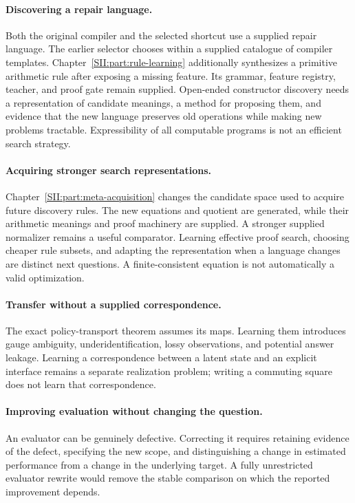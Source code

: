 \paragraph{Discovering a repair language.}
Both the original compiler and the selected shortcut use a supplied repair language. The earlier selector chooses within a supplied catalogue of compiler templates. Chapter~\ref{SII:part:rule-learning} additionally synthesizes a primitive arithmetic rule after exposing a missing feature. Its grammar, feature registry, teacher, and proof gate remain supplied. Open-ended constructor discovery needs a representation of candidate meanings, a method for proposing them, and evidence that the new language preserves old operations while making new problems tractable. Expressibility of all computable programs is not an efficient search strategy.

\paragraph{Acquiring stronger search representations.}
Chapter~\ref{SII:part:meta-acquisition} changes the candidate space used to acquire future discovery rules. The new equations and quotient are generated, while their arithmetic meanings and proof machinery are supplied. A stronger supplied normalizer remains a useful comparator. Learning effective proof search, choosing cheaper rule subsets, and adapting the representation when a language changes are distinct next questions. A finite-consistent equation is not automatically a valid optimization.

\paragraph{Transfer without a supplied correspondence.}
The exact policy-transport theorem assumes its maps. Learning them introduces gauge ambiguity, underidentification, lossy observations, and potential answer leakage. Learning a correspondence between a latent state and an explicit interface remains a separate realization problem; writing a commuting square does not learn that correspondence.

\paragraph{Improving evaluation without changing the question.}
An evaluator can be genuinely defective. Correcting it requires retaining evidence of the defect, specifying the new scope, and distinguishing a change in estimated performance from a change in the underlying target. A fully unrestricted evaluator rewrite would remove the stable comparison on which the reported improvement depends.

